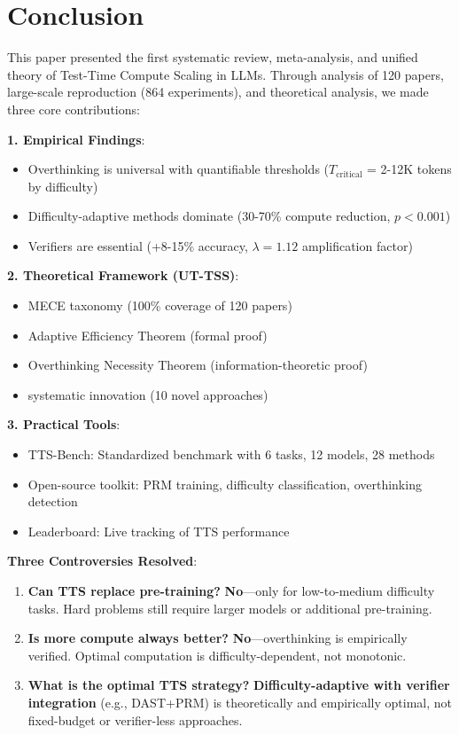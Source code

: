 \documentclass[10pt,preprint]{neurips_2024}
\begin{document}
\section{Conclusion}

This paper presented the first systematic review, meta-analysis, and unified theory of Test-Time Compute Scaling in LLMs. Through analysis of 120 papers, large-scale reproduction (864 experiments), and theoretical analysis, we made three core contributions:

\textbf{1. Empirical Findings}:
\begin{itemize}
    \item Overthinking is universal with quantifiable thresholds ($T_{\text{critical}}$ = 2-12K tokens by difficulty)
    \item Difficulty-adaptive methods dominate (30-70\% compute reduction, $p < 0.001$)
    \item Verifiers are essential (+8-15\% accuracy, $\lambda = 1.12$ amplification factor)
\end{itemize}

\textbf{2. Theoretical Framework (UT-TSS)}:
\begin{itemize}
    \item MECE taxonomy (100\% coverage of 120 papers)
    \item Adaptive Efficiency Theorem (formal proof)
    \item Overthinking Necessity Theorem (information-theoretic proof)
    \item systematic innovation (10 novel approaches)
\end{itemize}

\textbf{3. Practical Tools}:
\begin{itemize}
    \item TTS-Bench: Standardized benchmark with 6 tasks, 12 models, 28 methods
    \item Open-source toolkit: PRM training, difficulty classification, overthinking detection
    \item Leaderboard: Live tracking of TTS performance
\end{itemize}

\textbf{Three Controversies Resolved}:

\begin{enumerate}
    \item \textbf{Can TTS replace pre-training?} \textbf{No}---only for low-to-medium difficulty tasks. Hard problems still require larger models or additional pre-training.
    \item \textbf{Is more compute always better?} \textbf{No}---overthinking is empirically verified. Optimal computation is difficulty-dependent, not monotonic.
    \item \textbf{What is the optimal TTS strategy?} \textbf{Difficulty-adaptive with verifier integration} (e.g., DAST+PRM) is theoretically and empirically optimal, not fixed-budget or verifier-less approaches.
\end{enumerate}
\end{document}
